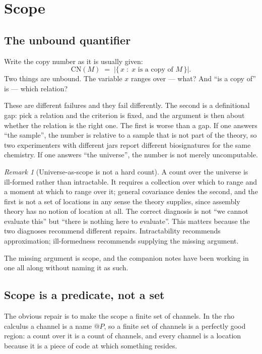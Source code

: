 \documentclass[11pt]{article}
\makeatletter
\theoremstyle{plain}
\theoremstyle{definition}
\theoremstyle{remark}
\newtheorem{remark}[theorem]{Remark}
\newcommand{\quo}[1]{@#1}
\newcommand{\CN}{\mathrm{CN}}
\makeatother
\begin{document}
\section{Scope}\label{sco:S3}

\subsection{The unbound quantifier}\label{sco:S3.1}

Write the copy number as it is usually given:
\[
  \CN(M) \;=\; \bigl|\{\, x \;:\; x \text{ is a copy of } M \,\}\bigr|.
\]
Two things are unbound. The variable $x$ ranges over --- what? And ``is a
copy of'' is --- which relation?

These are different failures and they fail differently. The second is a
definitional gap: pick a relation and the criterion is fixed, and the
argument is then about whether the relation is the right one. The first is
worse than a gap. If one answers ``the sample'', the number is relative to
a sample that is not part of the theory, so two experimenters with
different jars report different biosignatures for the same chemistry. If
one answers ``the universe'', the number is not merely uncomputable.

\begin{remark}[Universe-as-scope is not a hard count]\label{sco:rem:nocensus}
A count over the universe is ill-formed rather than intractable. It
requires a collection over which to range and a moment at which to range
over it; general covariance denies the second, and the first is not a set
of locations in any sense the theory supplies, since assembly theory has
no notion of location at all. The correct diagnosis is not ``we cannot
evaluate this'' but ``there is nothing here to evaluate''. This matters
because the two diagnoses recommend different repairs. Intractability
recommends approximation; ill-formedness recommends supplying the missing
argument.
\end{remark}

The missing argument is scope, and the companion notes have been working
in one all along without naming it as such.

\subsection{Scope is a predicate, not a set}\label{sco:S3.2}

The obvious repair is to make the scope a finite set of channels. In the
rho calculus a channel is a name $\quo{P}$, so a finite set of channels is
a perfectly good region: a count over it is a count of channels, and every
channel is a location because it is a piece of code at which something
resides.
\end{document}
